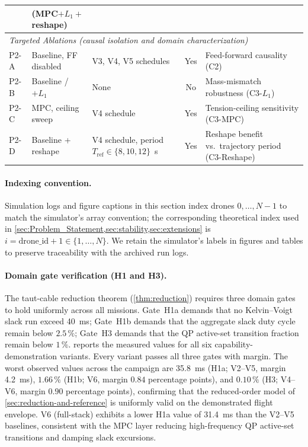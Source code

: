 \begin{table}[htbp]
\begin{tabular}{llp{5.5cm}cp{5cm}}
       & (MPC$+L_1+$reshape)  &                                                                                         &      & \\
    \midrule
    \multicolumn{5}{l}{\textit{Targeted Ablations (causal isolation and domain characterization)}} \\[\smallskipamount]
    P2-A & Baseline, FF disabled & V3, V4, V5 schedules                                                                 & Yes  & Feed-forward causality (C2) \\
    P2-B & Baseline / $+L_1$    & None                                                                                  & No   & Mass-mismatch robustness (C3-$L_1$) \\
    P2-C & MPC, ceiling sweep   & V4 schedule                                                                           & Yes  & Tension-ceiling sensitivity (C3-MPC) \\
    P2-D & Baseline + reshape   & V4 schedule, period $T_{\mathrm{ref}} \in \{8,10,12\}$~s                              & Yes  & Reshape benefit vs.\ trajectory period (C3-Reshape) \\
    \bottomrule
  \end{tabular}
\end{table}

\paragraph{Indexing convention.} Simulation logs and figure captions in this section index drones $0,\dots,N{-}1$ to match the simulator's array convention; the corresponding theoretical index used in \cref{sec:Problem_Statement,sec:stability,sec:extensions} is $i = \text{drone\_id} + 1 \in \{1,\dots,N\}$. We retain the simulator's labels in figures and tables to preserve traceability with the archived run logs.

\paragraph{Domain gate verification (H1 and H3).} The taut-cable reduction theorem (\cref{thm:reduction}) requires three domain gates to hold uniformly across all missions. Gate~H1a demands that no Kelvin--Voigt slack run exceed \SI{40}{\milli\second}; Gate~H1b demands that the aggregate slack duty cycle remain below $2.5\,\%$; Gate~H3 demands that the QP active-set transition fraction remain below $1\,\%$.  reports the measured values for all six capability-demonstration variants. Every variant passes all three gates with margin. The worst observed values across the campaign are \SI{35.8}{\milli\second} (H1a; V2--V5, margin \SI{4.2}{\milli\second}), $1.66\,\%$ (H1b; V6, margin $0.84$ percentage points), and $0.10\,\%$ (H3; V4--V6, margin $0.90$ percentage points), confirming that the reduced-order model of \cref{sec:reduction-and-reference} is uniformly valid on the demonstrated flight envelope. V6 (full-stack) exhibits a lower H1a value of \SI{31.4}{\milli\second} than the V2--V5 baselines, consistent with the MPC layer reducing high-frequency QP active-set transitions and damping slack excursions.

